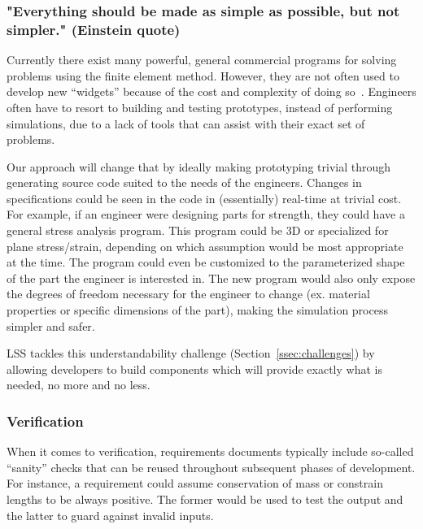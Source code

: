 \documentclass{sig-alternate-05-2015}
\newcommand{\lss}{LSS}
\begin{document}
\subsubsection{"Everything should be made as simple as possible, but not
  simpler."  (Einstein quote)} \label{sssec:adv_simple}

Currently there exist many powerful, general commercial programs for solving
problems using the finite element method. However, they are not often used to
develop new ``widgets'' because of the cost and complexity of doing
so~\cite{TODO}. %
Engineers often have to resort to building and testing prototypes, instead of
performing simulations, due to a lack of tools that can assist with their exact
set of problems. %

Our approach will change that by ideally making prototyping trivial through
generating source code suited to the needs of the engineers. Changes in
specifications could be seen in the code in (essentially) real-time at trivial
cost. For example, if an engineer were designing parts for strength, they could
have a general stress analysis program. This program could be 3D or specialized
for plane stress/strain, depending on which assumption would be most appropriate
at the time. The program could even be customized to the parameterized shape of
the part the engineer is interested in. The new program would also only expose
the degrees of freedom necessary for the engineer to change (ex. material
properties or specific dimensions of the part), making the simulation process
simpler and safer.

\lss{} tackles this understandability challenge (Section~\ref{ssec:challenges})
by allowing developers to build components which will provide exactly what is
needed, no more and no less.

\subsubsection{Verification} \label{sssec:adv_verify}

When it comes to verification, requirements documents typically include
so-called ``sanity'' checks that can be reused throughout subsequent phases of
development. For instance, a requirement could assume conservation of mass or
constrain lengths to be always positive. The former would be used to test the
output and the latter to guard against invalid inputs.
\end{document}
